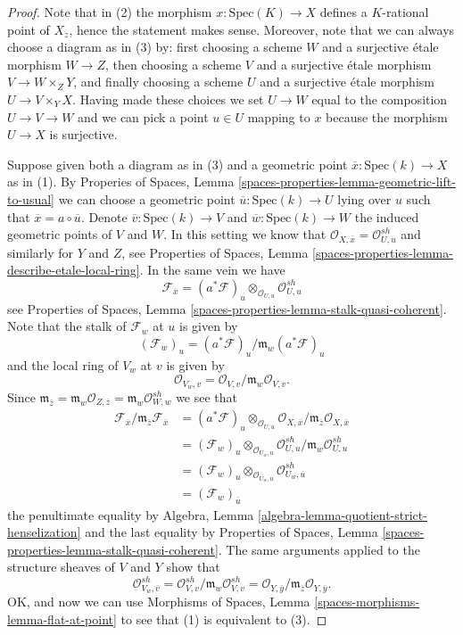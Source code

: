 \begin{proof}
Note that in (2) the morphism $x : \text{Spec}(K) \to X$ defines a
$K$-rational point of $X_z$, hence the statement makes sense. Moreover,
note that we can always choose a diagram as in (3) by: first choosing
a scheme $W$ and a surjective \'etale morphism $W \to Z$, then choosing
a scheme $V$ and a surjective \'etale morphism $V \to W \times_Z Y$, and
finally choosing a scheme $U$ and a surjective \'etale morphism
$U \to V \times_Y X$. Having made these choices we set $U \to W$ equal
to the composition $U \to V \to W$ and we can pick a point $u \in U$ mapping
to $x$ because the morphism $U \to X$ is surjective.

\medskip\noindent
Suppose given both a diagram as in (3) and a geometric point
$\overline{x} : \text{Spec}(k) \to X$ as in (1). By
Properies of Spaces, Lemma \ref{spaces-properties-lemma-geometric-lift-to-usual}
we can choose a geometric point $\overline{u} : \text{Spec}(k) \to U$
lying over $u$ such that $\overline{x} = a \circ \overline{u}$.
Denote $\overline{v} : \text{Spec}(k) \to V$ and
$\overline{w} : \text{Spec}(k) \to W$ the induced geometric points of
$V$ and $W$. In this setting we know that
$\mathcal{O}_{X, \overline{x}} = \mathcal{O}_{U, u}^{sh}$
and similarly for $Y$ and $Z$, see
Properties of Spaces,
Lemma \ref{spaces-properties-lemma-describe-etale-local-ring}.
In the same vein we have
$$
\mathcal{F}_{\overline{x}} =
(a^*\mathcal{F})_u \otimes_{\mathcal{O}_{U, u}}
\mathcal{O}_{U, u}^{sh}
$$
see
Properties of Spaces, Lemma \ref{spaces-properties-lemma-stalk-quasi-coherent}.
Note that the stalk of $\mathcal{F}_w$ at $u$ is given by
$$
(\mathcal{F}_w)_u = (a^*\mathcal{F})_u/\mathfrak m_w(a^*\mathcal{F})_u
$$
and the local ring of $V_w$ at $v$ is given by
$$
\mathcal{O}_{V_w, v} = \mathcal{O}_{V, v}/\mathfrak m_w\mathcal{O}_{V, v}.
$$
Since $\mathfrak m_{\overline{z}} =
\mathfrak m_w \mathcal{O}_{Z, \overline{z}} =
\mathfrak m_w \mathcal{O}_{W, w}^{sh}$
we see that
\begin{align*}
\mathcal{F}_{\overline{x}}/
\mathfrak m_{\overline{z}}\mathcal{F}_{\overline{x}} & =
(a^*\mathcal{F})_u \otimes_{\mathcal{O}_{U, u}}
\mathcal{O}_{X, \overline{x}}/
\mathfrak m_{\overline{z}}\mathcal{O}_{X, \overline{x}} \\
& = 
(\mathcal{F}_w)_u \otimes_{\mathcal{O}_{U_w, u}}
\mathcal{O}_{U, u}^{sh}/\mathfrak m_w\mathcal{O}_{U, u}^{sh} \\
& = (\mathcal{F}_w)_u \otimes_{\mathcal{O}_{U_w, u}}
\mathcal{O}_{U_w, \overline{u}}^{sh} \\
& = (\mathcal{F}_w)_{\overline{u}}
\end{align*}
the penultimate equality by
Algebra, Lemma \ref{algebra-lemma-quotient-strict-henselization}
and the last equality by
Properties of Spaces, Lemma \ref{spaces-properties-lemma-stalk-quasi-coherent}.
The same arguments applied to the structure sheaves of $V$ and $Y$
show that
$$
\mathcal{O}_{V_w, \overline{v}}^{sh} =
\mathcal{O}_{V, v}^{sh}/\mathfrak m_w \mathcal{O}_{V, v}^{sh} =
\mathcal{O}_{Y, \overline{y}}/
\mathfrak m_{\overline{z}}\mathcal{O}_{Y, \overline{y}}.
$$
OK, and now we can use
Morphisms of Spaces, Lemma \ref{spaces-morphisms-lemma-flat-at-point}
to see that (1) is equivalent to (3).


\end{proof}

